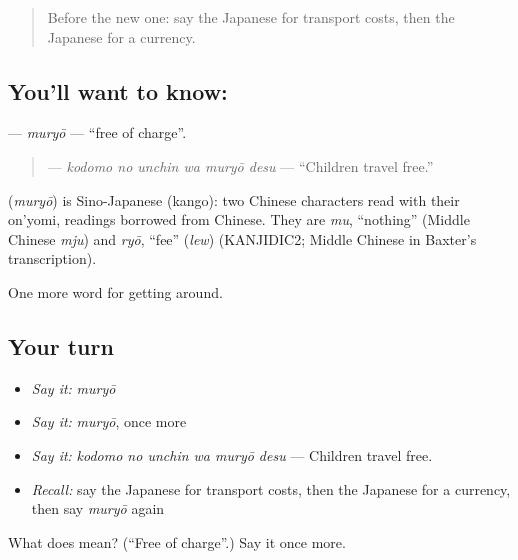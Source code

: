 \label{lesson:JA-C388-muryou}



\begin{quote}
Before the new one: say the Japanese for transport costs, then the Japanese for a currency.
\end{quote}

\subsection*{You'll want to know: }
\textbf{} — \emph{muryō} — \textquotedblleft{}free of charge\textquotedblright{}.

\begin{quote}
\textbf{  } — \emph{kodomo no unchin wa muryō desu} — \textquotedblleft{}Children travel free.\textquotedblright{}
\end{quote}

\begin{cousinweb}
\textbf{} (\emph{muryō}) is Sino-Japanese (kango): two Chinese characters read with their on'yomi, readings borrowed from Chinese. They are \emph{mu}, \textquotedblleft{}nothing\textquotedblright{} (Middle Chinese \emph{mju}) and \emph{ryō}, \textquotedblleft{}fee\textquotedblright{} (\emph{lew}) (KANJIDIC2; Middle Chinese in Baxter's transcription).
\end{cousinweb}

\begin{grammarlens}[title={What you've built}]
One more word for getting around.
\end{grammarlens}

\subsection*{Your turn}
\begin{itemize}
\raggedright
  \item \emph{Say it:} \emph{muryō}
  \item \emph{Say it:} \emph{muryō}, once more
  \item \emph{Say it:} \emph{kodomo no unchin wa muryō desu} — Children travel free.
  \item \emph{Recall:} say the Japanese for transport costs, then the Japanese for a currency, then say \emph{muryō} again
\end{itemize}

\begin{tcolorbox}[breakable,colback=teal!4,colframe=teal!35!black,title={Before you move on}]
What does  mean? (\textquotedblleft{}Free of charge\textquotedblright{}.) Say it once more.
\end{tcolorbox}
